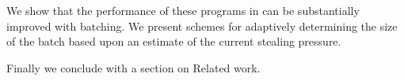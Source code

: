 
We show that the performance of these programs in \XWS{} can be
substantially improved with batching. We present schemes for
adaptively determining the size of the batch based upon an estimate of
the current stealing pressure.

Finally we conclude with a section on Related work.

